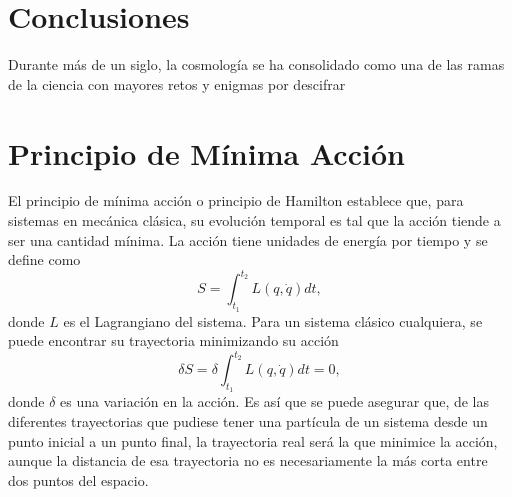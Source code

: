 \documentclass[a4paper,openright,12pt]{book}
\begin{document}
\chapter{Conclusiones}
Durante más de un siglo, la cosmología se ha consolidado como una de las ramas de la ciencia con mayores retos y enigmas por descifrar
\appendix 

\chapter{Principio de Mínima Acción}\label{Apend. A}
El principio de mínima acción o principio de Hamilton establece que, para sistemas en mecánica clásica, su evolución temporal es tal que la acción tiende a ser una cantidad mínima. La acción tiene unidades de energía por tiempo y se define como 
\begin{equation}
S = \int_{t_{1}}^{t_{2}}L(q,\dot{q})dt,\label{A1}
\end{equation}
donde $L$ es el Lagrangiano del sistema. Para un sistema clásico cualquiera, se puede encontrar su trayectoria minimizando su acción
\begin{equation}
\delta S = \delta \int_{t_{1}}^{t_{2}}L(q,\dot{q})dt = 0,\label{A2}
\end{equation} 
donde $\delta$ es una variación en la acción. Es así que se puede asegurar que, de las diferentes trayectorias que pudiese tener una partícula de un sistema desde un punto inicial a un punto final, la trayectoria real será la que minimice la acción, aunque la distancia de esa trayectoria no es necesariamente la más corta entre dos puntos del espacio.
\end{document}
